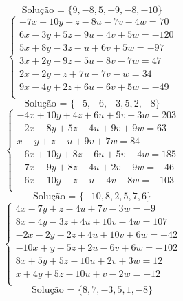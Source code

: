 \documentclass[12pt,oneside,a4paper]{article}
\begin{document}
\begin{equation*}
\text{Solução = }\{9,-8,5,-9,-8,-10\}
\end{equation*}
\vspace{\baselineskip}
\begin{equation*}
\begin{cases}
-7x-10y+z-8u-7v-4w=70 \\
6x-3y+5z-9u-4v+5w=-120 \\
5x+8y-3z-u+6v+5w=-97 \\
3x+2y-9z-5u+8v-7w=47 \\
2x-2y-z+7u-7v-w=34 \\
9x-4y+2z+6u-6v+5w=-49 \\
\end{cases}
\end{equation*}
\begin{equation*}
\text{Solução = }\{-5,-6,-3,5,2,-8\}
\end{equation*}
\vspace{\baselineskip}
\begin{equation*}
\begin{cases}
-4x+10y+4z+6u+9v-3w=203 \\
-2x-8y+5z-4u+9v+9w=63 \\
x-y+z-u+9v+7w=84 \\
-6x+10y+8z-6u+5v+4w=185 \\
-7x-9y+8z-4u+2v-9w=-46 \\
-6x-10y-z-u-4v-8w=-103 \\
\end{cases}
\end{equation*}
\begin{equation*}
\text{Solução = }\{-10,8,2,5,7,6\}
\end{equation*}
\vspace{\baselineskip}
\begin{equation*}
\begin{cases}
4x-7y+z-4u+7v-3w=-9 \\
8x-4y-3z+4u+10v-4w=107 \\
-2x-2y-2z+4u+10v+6w=-42 \\
-10x+y-5z+2u-6v+6w=-102 \\
8x+5y+5z-10u+2v+3w=12 \\
x+4y+5z-10u+v-2w=-12 \\
\end{cases}
\end{equation*}
\begin{equation*}
\text{Solução = }\{8,7,-3,5,1,-8\}
\end{equation*}
\end{document}
